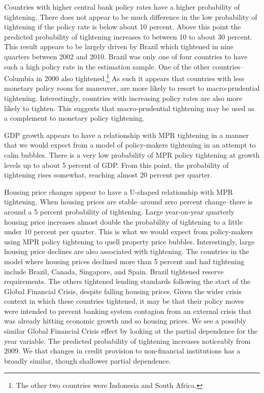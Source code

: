 \documentclass[]{article}
\let\rmarkdownfootnote\footnote%
\def\footnote{\protect\rmarkdownfootnote}
\begin{document}
Countries with higher central bank policy rates have a higher
probability of tightening. There does not appear to be much difference
in the low probability of tightening if the policy rate is below about
10 percent. Above this point the predicted probability of tightening
increases to between 10 to about 30 percent. This result appears to be
largely driven by Brazil which tightened in nine quarters between 2002
and 2010. Brazil was only one of four countries to have such a high
policy rate in the estimation sample. One of the other
countries--Columbia in 2000 also tightened.\footnote{The other two
  countries were Indonesia and South Africa.} As such it appears that
countries with less monetary policy room for maneuver, are more likely
to resort to macro-prudential tightening. Interestingly, countries with
increasing policy rates are also more likely to tighten. This suggests
that macro-prudential tightening may be used as a complement to monetary
policy tightening.

GDP growth appears to have a relationship with MPR tightening in a
manner that we would expect from a model of policy-makers tightening in
an attempt to calm bubbles. There is a very low probability of MPR
policy tightening at growth levels up to about 5 percent of GDP. From
this point, the probability of tightening rises somewhat, reaching
almost 20 percent per quarter.

Housing price changes appear to have a U-shaped relationship with MPR
tightening. When housing prices are stable--around zero percent
change--there is around a 5 percent probability of tightening. Large
year-on-year quarterly housing price increases almost double the
probability of tightening to a little under 10 percent per quarter. This
is what we would expect from policy-makers using MPR policy tightening
to quell property price bubbles. Interestingly, large housing price
declines are also associated with tightening. The countries in the model
where housing prices declined more than 5 percent and had tightening
include Brazil, Canada, Singapore, and Spain. Brazil tightened reserve
requirements. The others tightened lending standards following the start
of the Global Financial Crisis, despite falling housing prices. Given
the wider crisis context in which these countries tightened, it may be
that their policy moves were intended to prevent banking system
contagion from an external crisis that was already hitting economic
growth and so housing prices. We see a possibly similar Global Financial
Crisis effect by looking at the partial dependence for the year
variable. The predicted probability of tightening increases noticeably
from 2009. We that changes in credit provision to non-financial
institutions has a broadly similar, though shallower partial dependence.
\end{document}
